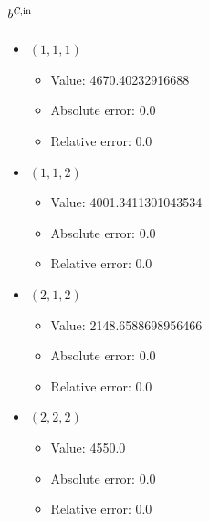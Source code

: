 \documentclass{article}%
\begin{document}
\subsection{$b^{\textsl{C},\text{in}}$}%
\begin{itemize}%
	\item $(1, 1, 1)$%
	\begin{itemize}%
		\item Value: 4670.40232916688%
		\item Absolute error: 0.0%
		\item Relative error: 0.0%
	\end{itemize}%
	\item $(1, 1, 2)$%
	\begin{itemize}%
		\item Value: 4001.3411301043534%
		\item Absolute error: 0.0%
		\item Relative error: 0.0%
	\end{itemize}%
	\item $(2, 1, 2)$%
	\begin{itemize}%
		\item Value: 2148.6588698956466%
		\item Absolute error: 0.0%
		\item Relative error: 0.0%
	\end{itemize}%
	\item $(2, 2, 2)$%
	\begin{itemize}%
		\item Value: 4550.0%
		\item Absolute error: 0.0%
		\item Relative error: 0.0%
	\end{itemize}%
\end{itemize}%
\end{document}

